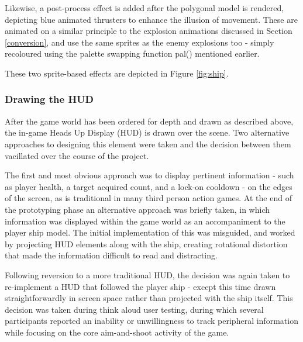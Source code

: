 \documentclass[11pt]{article}
\begin{document}
Likewise, a post-process effect is added after the polygonal model is rendered, depicting blue
animated thrusters to enhance the illusion of movement. These are animated on a similar principle
to the explosion animations discussed in Section \ref{conversion}, and use the same sprites as
the enemy explosions too - simply recoloured using the palette swapping function pal() mentioned
earlier.

These two sprite-based effects are depicted in Figure \ref{fig:ship}.





\subsubsection*{Drawing the HUD}

After the game world has been ordered for depth and drawn as described above, the in-game Heads Up
Display (HUD) is drawn over the scene. Two alternative approaches to designing this element were
taken and the decision between them vacillated over the course of the project.

The first and most obvious approach was to display pertinent information - such as player health,
a target acquired count, and a lock-on cooldown - on the edges of the screen, as is traditional in
many third person action games. At the end of the prototyping phase an alternative approach was
briefly taken, in which information was displayed within the game world as an accompaniment to
the player ship model. The initial implementation of this was misguided, and worked by projecting
HUD elements along with the ship, creating rotational distortion that made the information difficult
to read and distracting.

Following reversion to a more traditional HUD, the decision was again taken to re-implement a
HUD that followed the player ship - except this time drawn straightforwardly in screen space
rather than projected with the ship itself. This decision was taken during think aloud user testing,
during which several participants reported an inability or unwillingness to track peripheral
information while focusing on the core aim-and-shoot activity of the game.
\end{document}
